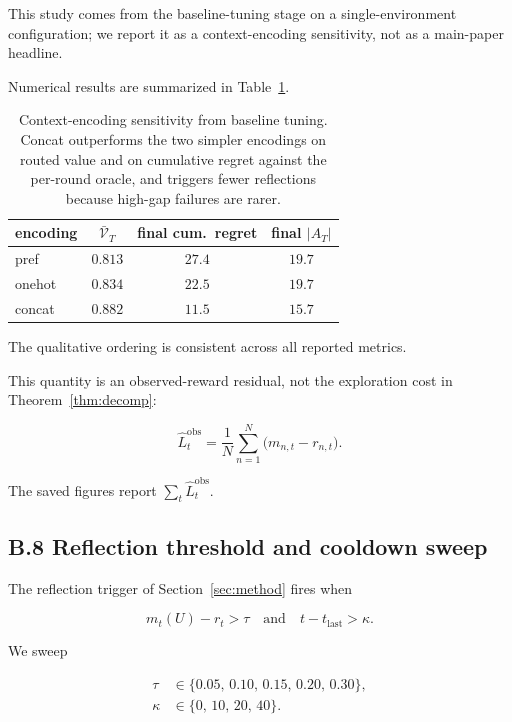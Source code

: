 \documentclass{article} %
\begin{document}
This study comes from the baseline-tuning stage on a single-environment configuration; we report it as a context-encoding sensitivity, not as a main-paper headline.

Numerical results are summarized in Table~\ref{tab:app-ctx-type}.

\begin{table}[h]
\centering
\small
\begin{tabular}{lccc}
\toprule
encoding & $\bar{\mathcal{V}}_T$ & final cum.\ regret & final $|A_T|$ \\
\midrule
pref     & $0.813$ & $27.4$ & $19.7$ \\
onehot   & $0.834$ & $22.5$ & $19.7$ \\
concat   & $0.882$ & $11.5$ & $15.7$ \\
\bottomrule
\end{tabular}
\caption{Context-encoding sensitivity from baseline tuning. Concat outperforms the two simpler encodings on routed value and on cumulative regret against the per-round oracle, and triggers fewer reflections because high-gap failures are rarer.}
\label{tab:app-ctx-type}
\end{table}

The qualitative ordering is consistent across all reported metrics.

This quantity is an observed-reward residual, not the exploration cost in
Theorem~\ref{thm:decomp}:

\begin{equation}
\label{eq:app-emp-LT-recap}
\hat L_t^{\mathrm{obs}}
=
\frac{1}{N}\sum_{n=1}^{N}\big(m_{n,t}-r_{n,t}\big).
\end{equation}

The saved figures report \(\sum_t\hat L_t^{\mathrm{obs}}\).

\subsection{B.8 Reflection threshold and cooldown sweep}

\label{app:reflection-sweep}

The reflection trigger of Section~\ref{sec:method} fires when

\begin{equation}
\label{eq:app-trigger-recap}
m_t(U)-r_t > \tau \quad\text{and}\quad t-t_{\text{last}}>\kappa.
\end{equation}

We sweep

\begin{align}
\label{eq:app-tau-grid}
\tau &\in \{0.05,\,0.10,\,0.15,\,0.20,\,0.30\},\\
\label{eq:app-kappa-grid}
\kappa &\in \{0,\,10,\,20,\,40\}.
\end{align}
\end{document}
